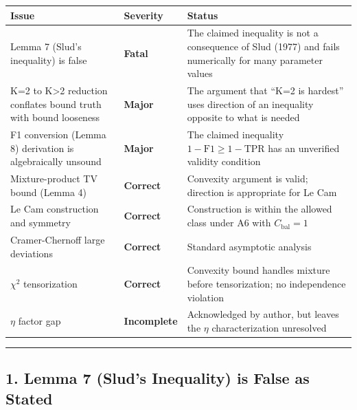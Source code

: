 \documentclass[
  12pt,
]{ctexart}
\begin{document}
\begin{longtable}[]{@{}
  >{\raggedright\arraybackslash}p{}
  >{\raggedright\arraybackslash}p{}
  >{\raggedright\arraybackslash}p{}@{}}
\toprule\noalign{}
\begin{minipage}[b]{\linewidth}\raggedright
Issue
\end{minipage} & \begin{minipage}[b]{\linewidth}\raggedright
Severity
\end{minipage} & \begin{minipage}[b]{\linewidth}\raggedright
Status
\end{minipage} \\
\midrule\noalign{}
\endhead
\bottomrule\noalign{}
\endlastfoot
Lemma 7 (Slud's inequality) is false & \textbf{Fatal} & The claimed
inequality is not a consequence of Slud (1977) and fails numerically for
many parameter values \\
K=2 to K\textgreater2 reduction conflates bound truth with bound
looseness & \textbf{Major} & The argument that ``K=2 is hardest'' uses
direction of an inequality opposite to what is needed \\
F1 conversion (Lemma 8) derivation is algebraically unsound &
\textbf{Major} & The claimed inequality
\(1-\text{F1} \geq 1-\text{TPR}\) has an unverified validity
condition \\
Mixture-product TV bound (Lemma 4) & \textbf{Correct} & Convexity
argument is valid; direction is appropriate for Le Cam \\
Le Cam construction and symmetry & \textbf{Correct} & Construction is
within the allowed class under A6 with \(C_\text{bal}=1\) \\
Cramer-Chernoff large deviations & \textbf{Correct} & Standard
asymptotic analysis \\
\(\chi^2\) tensorization & \textbf{Correct} & Convexity bound handles
mixture before tensorization; no independence violation \\
\(\eta\) factor gap & \textbf{Incomplete} & Acknowledged by author, but
leaves the \(\eta\) characterization unresolved \\
\end{longtable}

\begin{center}\rule{0.5\linewidth}{0.5pt}\end{center}

\subsection{1. Lemma 7 (Slud's Inequality) is False as
Stated}\label{lemma-7-sluds-inequality-is-false-as-stated}
\end{document}
